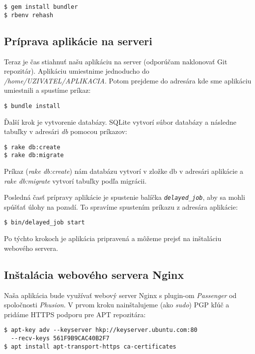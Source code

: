 \begin{verbatim}
$ gem install bundler
$ rbenv rehash
\end{verbatim}

\clearpage
\subsection*{Príprava aplikácie na serveri}

Teraz je čas stiahnuť našu aplikáciu na server (odporúčam naklonovať Git repozitár). Aplikáciu umiestnime jednoducho do \emph{/home/UZIVATEL/APLIKACIA}. Potom prejdeme do adresára kde sme aplikáciu umiestnili a spustíme príkaz:

\begin{verbatim}
$ bundle install
\end{verbatim}

Ďalší krok je vytvorenie databázy. SQLite vytvorí súbor databázy a následne tabuľky v adresári \emph{db} pomocou príkazov:

\begin{verbatim}
$ rake db:create
$ rake db:migrate
\end{verbatim}

Príkaz (\emph{rake db:create}) nám databázu vytvorí v zložke db v adresári aplikácie a \emph{rake db:migrate} vytvorí tabuľky podľa migrácii.

Posledná časť prípravy aplikácie je spustenie balíčka \emph{\texttt{delayed\_job}}, aby sa mohli spúšťať úlohy na pozadí. To spravíme spustením príkazu z adresára aplikácie:

\begin{verbatim}
$ bin/delayed_job start
\end{verbatim}

Po týchto krokoch je aplikácia pripravená a môžeme prejsť na inštaláciu webového servera.

\subsection*{Inštalácia webového servera Nginx}

Naša aplikácia bude využívať webový server Nginx s plugin-om \emph{Passenger} od spoločnosti \emph{Phusion}. V prvom kroku nainštalujeme (ako \emph{sudo}) PGP kľúč a pridáme HTTPS podporu pre APT repozitára:

\begin{verbatim}
$ apt-key adv --keyserver hkp://keyserver.ubuntu.com:80 
  --recv-keys 561F9B9CAC40B2F7
$ apt install apt-transport-https ca-certificates
\end{verbatim}

